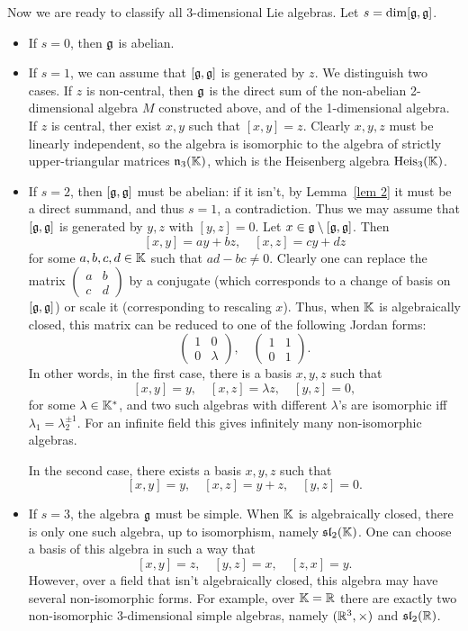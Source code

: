 Now we are ready to classify all 3-dimensional Lie algebras. Let $s=\dim[\mathfrak{g},\mathfrak{g}]$.
\begin{itemize}
    \item If $s=0$, then $\mathfrak{g}$ is abelian.
    \item If $s=1$, we can assume that $[\mathfrak{g},\mathfrak{g}]$ is generated by $z$. We distinguish two cases. If $z$ is non-central, then $\mathfrak{g}$ is the direct sum of the non-abelian 2-dimensional algebra $M$ constructed above, and of the 1-dimensional algebra. If $z$ is central, ther exist $x,y$ such that $[x,y]=z$. Clearly $x,y,z$ must be linearly independent, so the algebra is isomorphic to the algebra of strictly upper-triangular matrices $\mathfrak{n}_3(\mathbb{K})$, which is the Heisenberg algebra $\operatorname{Heis}_3(\mathbb{K})$.
    \item If $s=2$, then $[\mathfrak{g},\mathfrak{g}]$ must be abelian: if it isn't, by Lemma~\ref{lem 2} it must be a direct summand, and thus $s=1$, a contradiction. Thus we may assume that $[\mathfrak{g},\mathfrak{g}]$ is generated by $y,z$ with $[y,z]=0$. Let $x\in \mathfrak{g}\setminus[\mathfrak{g},\mathfrak{g}]$. Then
    \[[x,y]=ay+bz,\quad [x,z]=cy+dz\]
    for some $a,b,c,d\in\mathbb{K}$ such that $ad-bc\neq 0$. Clearly one can replace the matrix $\begin{pmatrix}
        a&b\\c&d
    \end{pmatrix}$
    by a conjugate (which corresponds to a change of basis on $[\mathfrak{g},\mathfrak{g}]$) or scale it (corresponding to rescaling $x$). Thus, when $\mathbb{K}$ is algebraically closed, this matrix can be reduced to one of the following Jordan forms:
    \[\begin{pmatrix}
        1&0\\
        0&\lambda
    \end{pmatrix},\quad 
    \begin{pmatrix}
        1&1\\
        0&1
    \end{pmatrix}.\]
    In other words, in the first case, there is a basis $x,y,z$ such that
    \[[x,y]=y,\quad [x,z]=\lambda z,\quad [y,z]=0,\]
    for some $\lambda\in\mathbb{K}^\ast$, and two such algebras with different $\lambda$'s are isomorphic iff $\lambda_1=\lambda_2^{\pm 1}$. For an infinite field this gives infinitely many non-isomorphic algebras. 

    In the second case, there exists a basis $x,y,z$ such that
    \[[x,y]=y,\quad [x,z]=y+z,\quad [y,z]=0.\]

    \item If $s=3$, the algebra $\mathfrak{g}$ must be simple. When $\mathbb{K}$ is algebraically closed, there is only one such algebra, up to isomorphism, namely $\mathfrak{sl}_2(\mathbb{K})$. One can choose a basis of this algebra in such a way that 
    \[[x,y]=z,\quad [y,z]=x,\quad [z,x]=y.\]
    However, over a field that isn't algebraically closed, this algebra may have several non-isomorphic forms. For example, over $\mathbb{K}=\mathbb{R}$ there are exactly two non-isomorphic 3-dimensional simple algebras, namely $(\mathbb{R}^3,\times)$ and $\mathfrak{sl}_2(\mathbb{R})$.
\end{itemize}


